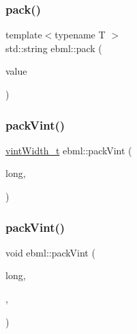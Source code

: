 \mbox{\label{namespaceebml_a8cf030e141b95cd742c465794a8faf02}} 
\subsubsection{\texorpdfstring{pack()}{pack()}\hspace{0.1cm}{\footnotesize\ttfamily [18/18]}}
{\footnotesize\ttfamily template$<$typename T $>$ \\
std\+::string ebml\+::pack (\begin{DoxyParamCaption}\item[{const T \&}]{value }\end{DoxyParamCaption})}

\mbox{\label{namespaceebml_a0ccc1293a99e95cd38a5125cb7d15361}} 
\subsubsection{\texorpdfstring{pack\+Vint()}{packVint()}\hspace{0.1cm}{\footnotesize\ttfamily [1/2]}}
{\footnotesize\ttfamily \mbox{\hyperlink{namespaceebml_a2ccdfb60b23efb51fe07f9d066e23604}{vint\+Width\+\_\+t}} ebml\+::pack\+Vint (\begin{DoxyParamCaption}\item[{unsigned long}]{long,  }\item[{char $\ast$}]{ }\end{DoxyParamCaption})}

\mbox{\label{namespaceebml_ab96b36c3bf5bae473a35bec372103006}} 
\subsubsection{\texorpdfstring{pack\+Vint()}{packVint()}\hspace{0.1cm}{\footnotesize\ttfamily [2/2]}}
{\footnotesize\ttfamily void ebml\+::pack\+Vint (\begin{DoxyParamCaption}\item[{unsigned long}]{long,  }\item[{\mbox{\hyperlink{namespaceebml_a2ccdfb60b23efb51fe07f9d066e23604}{vint\+Width\+\_\+t}}}]{,  }\item[{char $\ast$}]{ }\end{DoxyParamCaption})}

